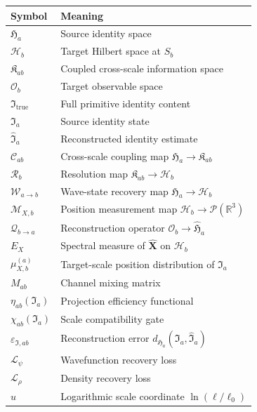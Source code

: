 \documentclass[12pt, a4paper]{article}
\theoremstyle{definition}
\theoremstyle{plain}
\theoremstyle{remark}
\newcommand{\Itrue}{\mathfrak{I}_{\mathrm{true}}}
\newcommand{\Ia}{\mathfrak{I}_a}
\newcommand{\Ihat}{\widehat{\mathfrak{I}}_a}
\newcommand{\Ha}{\mathfrak{H}_a}        %
\newcommand{\Hb}{\mathcal{H}_b}         %
\newcommand{\Hahat}{\widehat{\mathfrak{H}}_a}  %
\newcommand{\Kab}{\mathfrak{K}_{ab}}    %
\newcommand{\Osp}{\mathcal{O}_b}        %
\newcommand{\ProbR}{\mathcal{P}(\mathbb{R}^3)} %
\newcommand{\Sb}{S_b}
\newcommand{\Wab}{\mathcal{W}_{a\to b}}   %
\newcommand{\Qba}{\mathcal{Q}_{b\to a}}   %
\newcommand{\Cab}{\mathcal{C}_{ab}}        %
\newcommand{\Rb}{\mathcal{R}_b}            %
\newcommand{\MXb}{\mathcal{M}_{X,b}}      %
\newcommand{\Xhat}{\hat{\mathbf{X}}}
\newcommand{\EX}{E_X}
\newcommand{\muX}{\mu_{X,b}^{(a)}}
\newcommand{\chiab}{\chi_{ab}}
\newcommand{\etaab}{\eta_{ab}}
\newcommand{\epsI}{\varepsilon_{\mathfrak{I},ab}}
\newcommand{\dHa}{d_{\Ha}}
\newcommand{\Lpsi}{\mathcal{L}_\psi}
\newcommand{\Lrho}{\mathcal{L}_\rho}
\newcommand{\Mab}{M_{ab}}
\newcommand{\uscl}{u}
\begin{document}
\begin{center}
\renewcommand{\arraystretch}{1.45}
\begin{tabular}{@{}lp{8.5cm}@{}}
  \toprule
  Symbol & Meaning \\
  \midrule
  $\Ha$          & Source identity space \\
  $\Hb$          & Target Hilbert space at $\Sb$ \\
  $\Kab$         & Coupled cross-scale information space \\
  $\Osp$         & Target observable space \\
  $\Itrue$       & Full primitive identity content \\
  $\Ia$          & Source identity state \\
  $\Ihat$        & Reconstructed identity estimate \\
  $\Cab$         & Cross-scale coupling map $\Ha\to\Kab$ \\
  $\Rb$          & Resolution map $\Kab\to\Hb$ \\
  $\Wab$         & Wave-state recovery map $\Ha\to\Hb$ \\
  $\MXb$         & Position measurement map $\Hb\to\ProbR$ \\
  $\Qba$         & Reconstruction operator $\Osp\to\Hahat$ \\
  $\EX$          & Spectral measure of $\Xhat$ on $\Hb$ \\
  $\muX$         & Target-scale position distribution of $\Ia$ \\
  $\Mab$         & Channel mixing matrix \\
  $\etaab(\Ia)$  & Projection efficiency functional \\
  $\chiab(\Ia)$  & Scale compatibility gate \\
  $\epsI$        & Reconstruction error $\dHa(\Ia,\Ihat)$ \\
  $\Lpsi$        & Wavefunction recovery loss \\
  $\Lrho$        & Density recovery loss \\
  $\uscl$        & Logarithmic scale coordinate $\ln(\ell/\ell_0)$ \\
  \bottomrule
\end{tabular}
\end{center}
\end{document}
